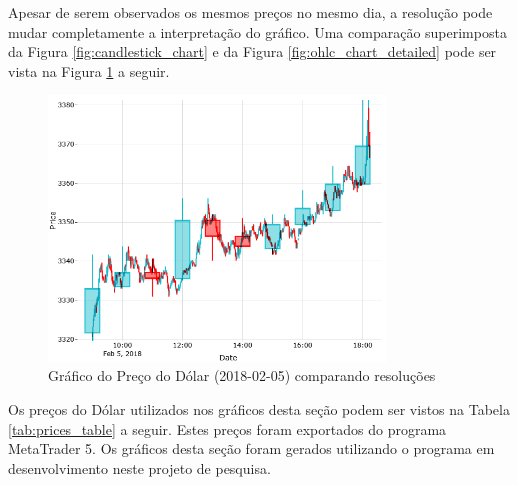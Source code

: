 \documentclass[12pt]{article}
\begin{document}
Apesar de serem observados os mesmos preços no mesmo dia, a resolução pode mudar completamente
a interpretação do gráfico. Uma comparação superimposta da Figura \ref{fig:candlestick_chart}
e da Figura \ref{fig:ohlc_chart_detailed} pode ser vista na
Figura \ref{fig:ohlc_chart_detailed_superimposed} a seguir.

\begin{figure}[H]
	\centering
	\includegraphics[width=0.8\textwidth]{ohlc_chart_detailed_superimposed.png}
	\caption{Gráfico do Preço do Dólar (2018-02-05) comparando resoluções}
	\label{fig:ohlc_chart_detailed_superimposed}
\end{figure}

Os preços do Dólar utilizados nos gráficos desta seção podem ser vistos na
Tabela \ref{tab:prices_table} a seguir. Estes preços foram exportados do programa
MetaTrader 5. Os gráficos desta seção foram gerados utilizando o programa em
desenvolvimento neste projeto de pesquisa.
\end{document}
